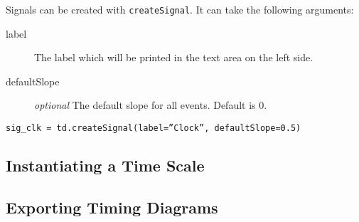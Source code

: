 \documentclass[11pt]{article}
\begin{document}
Signals can be created with \texttt{createSignal}. It can take the following
arguments:

\begin{description}
\item[label] The label which will be printed in the text area on the left side.
\item[defaultSlope] \emph{optional} The default slope for all events. Default is 0.
\end{description}

\begin{center}
  \texttt{sig\_clk = td.createSignal(label=''Clock'', defaultSlope=0.5)}
\end{center}

\subsection{Instantiating a Time Scale}
\label{sec:tis}



\subsection{Exporting Timing Diagrams}
\label{sec:exp}
\end{document}
